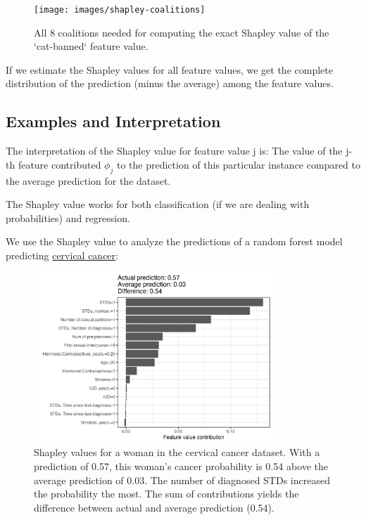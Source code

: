 \documentclass[
  10pt,
]{scrbook}
\begin{document}
\begin{figure}

{\centering \texttt{[image: images/shapley-coalitions]} 

}

\caption{All 8 coalitions needed for computing the exact Shapley value of the `cat-banned` feature value.}\label{fig:shapley-coalitions}
\end{figure}

If we estimate the Shapley values for all feature values, we get the complete distribution of the prediction (minus the average) among the feature values.

\hypertarget{examples-and-interpretation}{%
\subsection{Examples and Interpretation}\label{examples-and-interpretation}}

The interpretation of the Shapley value for feature value j is:
The value of the j-th feature contributed \(\phi_j\) to the prediction of this particular instance compared to the average prediction for the dataset.

The Shapley value works for both classification (if we are dealing with probabilities) and regression.

We use the Shapley value to analyze the predictions of a random forest model predicting \protect\hyperlink{cervical}{cervical cancer}:

\begin{figure}

{\centering \includegraphics[width=0.8\textwidth]{images/shapley-cervical-plot-1} 

}

\caption{Shapley values for a woman in the cervical cancer dataset. With a prediction of 0.57, this woman's cancer probability is 0.54 above the average prediction of 0.03. The number of diagnosed STDs increased the probability the most. The sum of contributions yields the difference between actual and average prediction (0.54).}\label{fig:shapley-cervical-plot}
\end{figure}
\end{document}
